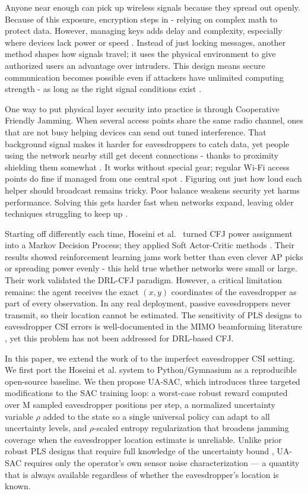 \documentclass[conference]{IEEEtran}
\begin{document}
Anyone near enough can pick up wireless signals because they spread out openly. Because of this exposure, encryption steps in - relying on complex math to protect data. However, managing keys adds delay and complexity, especially where devices lack power or speed \cite{wyner}. Instead of just locking messages, another method shapes how signals travel; it uses the physical environment to give authorized users an advantage over intruders. This design means secure communication becomes possible even if attackers have unlimited computing strength - as long as the right signal conditions exist \cite{wyner,gaussian,broadcast}.

One way to put physical layer security into practice is through Cooperative Friendly Jamming. When several access points share the same radio channel, ones that are not busy helping devices can send out tuned interference. That background signal makes it harder for eavesdroppers to catch data, yet people using the network nearby still get decent connections - thanks to proximity shielding them somewhat \cite{tekin,dong}. It works without special gear; regular Wi-Fi access points do fine if managed from one central spot \cite{wifi5,spectrum}. Figuring out just how loud each helper should broadcast remains tricky. Poor balance weakens security yet harms performance. Solving this gets harder fast when networks expand, leaving older techniques struggling to keep up \cite{hoseini}.

Starting off differently each time, Hoseini et al.~\cite{hoseini} turned CFJ power assignment into a Markov Decision Process; they applied Soft Actor-Critic methods \cite{sac1,sac2}. Their results showed reinforcement learning jams work better than even clever AP picks or spreading power evenly - this held true whether networks were small or large. Their work validated the DRL-CFJ paradigm. However, a critical limitation remains: the agent receives the exact $(x,y)$ coordinates of the eavesdropper as part of every observation. In any real deployment, passive eavesdroppers never transmit, so their location cannot be estimated. The sensitivity of PLS designs to eavesdropper CSI errors is well-documented in the MIMO beamforming literature \cite{mukherjee,wang}, yet this problem has not been addressed for DRL-based CFJ.

In this paper, we extend the work of \cite{hoseini} to the imperfect eavesdropper CSI setting. We first port the Hoseini et al. system to Python/Gymnasium as a reproducible open-source baseline. We then propose UA-SAC, which introduces three targeted modifications to the SAC training loop: a worst-case robust reward computed over M sampled eavesdropper positions per step, a normalized uncertainty variable $\rho$ added to the state so a single universal policy can adapt to all uncertainty levels, and $\rho$-scaled entropy regularization that broadens jamming coverage when the eavesdropper location estimate is unreliable. Unlike prior robust PLS designs that require full knowledge of the uncertainty bound \cite{mukherjee,wang}, UA-SAC requires only the operator's own sensor noise characterization --- a quantity that is always available regardless of whether the eavesdropper's location is known.
\end{document}
